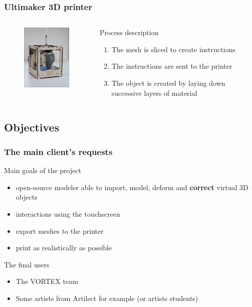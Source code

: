 \documentclass{beamer}
\begin{document}
\begin{frame}
	\frametitle{Ultimaker 3D printer}
	
	\begin{columns}[t]
  	\begin{column}{5cm}
  		\begin{figure}
		\includegraphics[width=4cm]{Ultimaker}	
		\end{figure}
  	\end{column}
  
  	\begin{column}{5cm}
  		\begin{block}{Process description}
  		\begin{enumerate}
  		\item The mesh is sliced to create instructions
  		\item The instructions are sent to the printer
  		\item The object is created by laying down successive layers of material
  		\end{enumerate}
 	 	\end{block}   
  	\end{column}
 	\end{columns}  
\end{frame}


\subsection{Objectives}
\begin{frame}
	\frametitle{The main client's requests}
	\begin{block}{Main goals of the project} 
	\begin{itemize}
		\item open-source modeler able to import, model, deform and \textbf{correct} virtual 3D objects
		\item interactions using the touchscreen
		\item export meshes to the printer
		\item print as realistically as possible
	\end{itemize}
    \end{block}
    
    \begin{block}{The final users}
    	\begin{itemize}
		\item The VORTEX team
		\item Some artists from Artilect for example (or artists students)
		\end{itemize}
    \end{block}
    
\end{frame}
\end{document}
